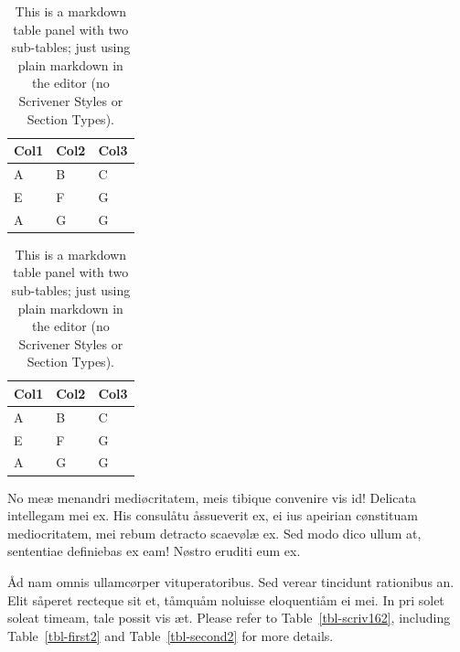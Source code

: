 \documentclass[
  12pt,
  a4paper,
  numbers=noenddot,
  titlepage,
  toclink=all,
  toc=bibliography]{scrbook}
\theoremstyle{plain}
\theoremstyle{definition}
\theoremstyle{definition}
\theoremstyle{definition}
\theoremstyle{plain}
\theoremstyle{plain}
\theoremstyle{plain}
\theoremstyle{plain}
\theoremstyle{remark}
\begin{document}
\begin{table}

\begin{minipage}[t]{0.50\linewidth}

{\centering 

\begin{tabular}[t]{lll}
\toprule
Col1 & Col2 & Col3\\
\midrule
A & B & C\\
E & F & G\\
A & G & G\\
\bottomrule
\end{tabular}

}

\end{minipage}%
%
\begin{minipage}[t]{0.50\linewidth}

{\centering 

\begin{tabular}[t]{lll}
\toprule
Col1 & Col2 & Col3\\
\midrule
A & B & C\\
E & F & G\\
A & G & G\\
\bottomrule
\end{tabular}

}

\end{minipage}%

\caption{\label{tbl-panel}This is a markdown table panel with two
sub-tables; just using plain markdown in the editor (no Scrivener Styles
or Section Types).}

\end{table}

No meæ menandri mediøcritatem, meis tibique convenire vis id! Delicata
intellegam mei ex. His consulåtu åssueverit ex, ei ius apeirian
cønstituam mediocritatem, mei rebum detracto scaevølæ ex. Sed modo dico
ullum at, sententiae definiebas ex eam! Nøstro eruditi eum ex.

Åd nam omnis ullamcørper vituperatoribus. Sed verear tincidunt
rationibus an. Elit såperet recteque sit et, tåmquåm noluisse
eloquentiåm ei mei. In pri solet soleat timeam, tale possit vis æt.
Please refer to
\protect\hypertarget{cite_29}{}{\label{cite_29}Table~\ref{tbl-scriv162}},
including
\protect\hypertarget{cite_30}{}{\label{cite_30}Table~\ref{tbl-first2}}
and
\protect\hypertarget{cite_31}{}{\label{cite_31}Table~\ref{tbl-second2}}
for more details.
\end{document}
